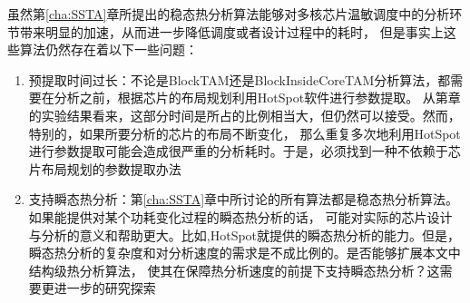 虽然第\ref{cha:SSTA}章所提出的稳态热分析算法能够对多核芯片温敏调度中的分析环节带来明显的加速，从而进一步降低调度或者设计过程中的耗时， 但是事实上这些算法仍然存在着以下一些问题：
\begin{enumerate}[1)]
\item 预提取时间过长：不论是BlockTAM还是BlockInsideCoreTAM分析算法，都需要在分析之前，根据芯片的布局规划利用HotSpot软件进行参数提取。 从第章的实验结果看来，这部分时间是所占的比例相当大，但仍然可以接受。然而，特别的，如果所要分析的芯片的布局不断变化， 那么重复多次地利用HotSpot进行参数提取可能会造成很严重的分析耗时。于是，必须找到一种不依赖于芯片布局规划的参数提取办法
\item 支持瞬态热分析：第\ref{cha:SSTA}章中所讨论的所有算法都是稳态热分析算法。如果能提供对某个功耗变化过程的瞬态热分析的话， 可能对实际的芯片设计与分析的意义和帮助更大。比如,HotSpot就提供的瞬态热分析的能力。但是， 瞬态热分析的复杂度和对分析速度的需求是不成比例的。是否能够扩展本文中结构级热分析算法， 使其在保障热分析速度的前提下支持瞬态热分析？这需要更进一步的研究探索
\end{enumerate}


